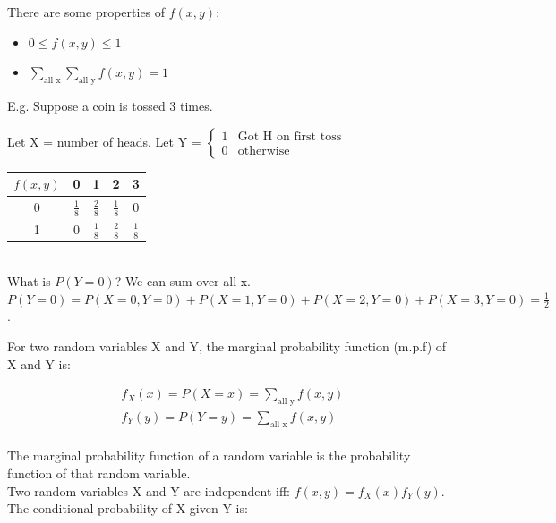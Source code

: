 \documentclass[12pt, letterpaper]{article}
\begin{document}
There are some properties of \(f\left(x, y\right)\):
\begin{itemize}
\item \(0 \leq f\left(x, y\right) \leq 1\)
\item \(\sum\limits_{\text{all x}} \sum\limits_{\text{all y}} f\left(x, y\right) = 1\)
\end{itemize}

E.g. Suppose a coin is tossed 3 times. 

Let X = number of heads. Let Y = $\begin{cases} 1 & \text{Got H on first toss}\\ 0 & \text{otherwise}\end{cases}$\\

\begin{tabular}{|c|c|c|c|c|}
\hline
$f\left(x, y\right)$ & 0 & 1 & 2 & 3\\ 
\hline
0 & $\frac{1}{8}$ & $\frac{2}{8}$ & $\frac{1}{8}$ & 0\\
\hline
1 & 0 & $\frac{1}{8}$ & $\frac{2}{8}$ & $\frac{1}{8}$\\
\hline
\end{tabular}\\

What is $P\left(Y = 0\right)$? We can sum over all x. $P\left(Y = 0\right) = P\left(X = 0, Y = 0\right) + P\left(X = 1, Y = 0\right) + P\left(X = 2, Y = 0\right) + P\left(X = 3, Y = 0\right) = \frac{1}{2}$.

\vspace{7mm}

For two random variables X and Y, the marginal probability function (m.p.f) of X and Y is:

\begin{align}
f_X \left(x\right) = P\left(X = x\right) = \sum\limits_{\text{all y}} f\left(x, y\right)\\
f_Y \left(y\right) = P\left(Y = y\right) = \sum\limits_{\text{all x}} f\left(x, y\right)
\end{align}\\

The marginal probability function of a random variable is the probability function of that random variable.\\

Two random variables X and Y are independent iff: $f\left(x, y\right) = f_X \left(x\right) f_Y \left(y\right)$.\\

The conditional probability of X given Y is:
\end{document}
